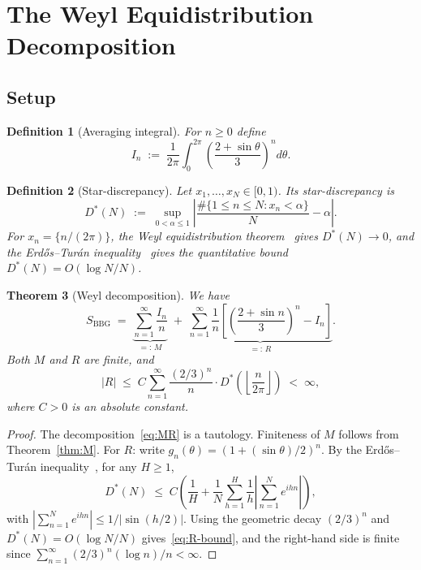 \documentclass[12pt]{amsart}
\newtheorem{theorem}{Theorem}[section]
\newtheorem{definition}[theorem]{Definition}
\begin{document}
\section{The Weyl Equidistribution Decomposition}

\subsection{Setup}

\begin{definition}[Averaging integral]\label{def:In}
For $n\ge 0$ define
\[
  I_n \;:=\; \frac{1}{2\pi}\int_{0}^{2\pi}
               \!\left(\frac{2+\sin\theta}{3}\right)^{\!n}d\theta.
\]
\end{definition}

\begin{definition}[Star-discrepancy]\label{def:disc}
Let $x_1,\ldots,x_N\in[0,1)$. Its star-discrepancy is
\[
  D^{*}(N) \;:=\; \sup_{0<\alpha\le 1}
  \left|\frac{\#\{1\le n\le N:x_n<\alpha\}}{N}-\alpha\right|.
\]
For $x_n=\{n/(2\pi)\}$, the Weyl equidistribution theorem~\cite{Weyl1916}
gives $D^{*}(N)\to 0$, and the Erd\H{o}s--Tur\'an
inequality~\cite{KuipersNiederreiter1974} gives the quantitative bound
$D^{*}(N)=O(\log N/N)$.
\end{definition}

\begin{theorem}[Weyl decomposition]\label{thm:weyl}
We have
\begin{equation}\label{eq:MR}
  S_{\mathrm{BBG}}
  \;=\; \underbrace{\sum_{n=1}^{\infty}\frac{I_n}{n}}_{=:\,M}
  \;+\; \underbrace{\sum_{n=1}^{\infty}\frac{1}{n}
        \!\left[\!\left(\frac{2+\sin n}{3}\right)^{\!n}-I_n\right]}_{=:\,R}.
\end{equation}
Both $M$ and $R$ are finite, and
\begin{equation}\label{eq:R-bound}
  |R| \;\le\; C\sum_{n=1}^{\infty}\frac{(2/3)^n}{n}\cdot D^{*}\!
        \!\left(\!\left\lfloor\frac{n}{2\pi}\right\rfloor\right)
  \;<\;\infty,
\end{equation}
where $C>0$ is an absolute constant.
\end{theorem}

\begin{proof}
The decomposition~\eqref{eq:MR} is a tautology.  Finiteness of $M$
follows from Theorem~\ref{thm:M}.  For $R$: write
$g_n(\theta)=(1+(\sin\theta)/2)^n$.  By the Erd\H{o}s--Tur\'an
inequality~\cite{KuipersNiederreiter1974}, for any $H\ge 1$,
\[
  D^{*}(N) \;\le\; C\!\left(\frac{1}{H}
  +\frac{1}{N}\sum_{h=1}^{H}\frac{1}{h}
   \left|\sum_{n=1}^{N}e^{ihn}\right|\right),
\]
with $|\sum_{n=1}^N e^{ihn}|\le 1/|\sin(h/2)|$.  Using the geometric
decay $(2/3)^n$ and $D^*(N)=O(\log N/N)$ gives~\eqref{eq:R-bound},
and the right-hand side is finite since
$\sum_{n=1}^{\infty}(2/3)^n(\log n)/n<\infty$.
\end{proof}
\end{document}
